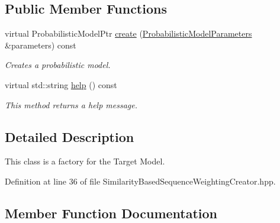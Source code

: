 \subsection*{Public Member Functions}
\begin{DoxyCompactItemize}
\item 
virtual Probabilistic\+Model\+Ptr \hyperlink{classtops_1_1SimilarityBasedSequenceWeightingCreator_a8d0c396745a850e8fd2f17df6d4244b5}{create} (\hyperlink{classtops_1_1ProbabilisticModelParameters}{Probabilistic\+Model\+Parameters} \&parameters) const
\begin{DoxyCompactList}\small\item\em Creates a probabilistic model. \end{DoxyCompactList}\item 
\mbox{\label{classtops_1_1SimilarityBasedSequenceWeightingCreator_ac47fccb399179b4406352c76815dbbc4}} 
virtual std\+::string \hyperlink{classtops_1_1SimilarityBasedSequenceWeightingCreator_ac47fccb399179b4406352c76815dbbc4}{help} () const
\begin{DoxyCompactList}\small\item\em This method returns a help message. \end{DoxyCompactList}\end{DoxyCompactItemize}


\subsection{Detailed Description}
This class is a factory for the Target Model. 

Definition at line 36 of file Similarity\+Based\+Sequence\+Weighting\+Creator.\+hpp.



\subsection{Member Function Documentation}
\mbox{\label{classtops_1_1SimilarityBasedSequenceWeightingCreator_a8d0c396745a850e8fd2f17df6d4244b5}} 
